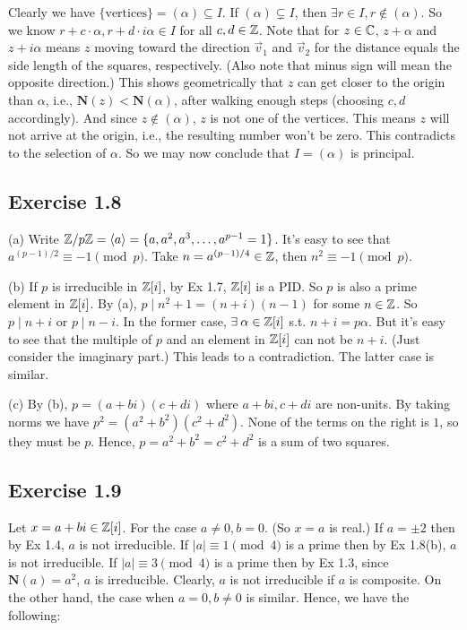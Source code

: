 \documentclass[../Marcus.tex]{subfiles}
\begin{document}
Clearly we have $\{\text{vertices}\}=(\alpha)\subseteq I$. If $(\alpha)\varsubsetneq I$, then $\exists r\in I,r\notin(\alpha)$. So we know $r+c\cdot\alpha,r+d\cdot i\alpha\in I$ for all $c,d\in\mathbb{Z}$. Note that for $z\in\mathbb{C}$, $z+\alpha$ and $z+i\alpha$ means $z$ moving toward the direction $\vec v_1$ and $\vec v_2$ for the distance equals the side length of the squares, respectively. (Also note that minus sign will mean the opposite direction.) This shows geometrically that $z$ can get closer to the origin than $\alpha$, i.e., $\mathbf{N}(z)<\mathbf{N}(\alpha)$, after walking enough steps (choosing $c,d$ accordingly). And since $z\notin(\alpha)$, $z$ is not one of the vertices. This means $z$ will not arrive at the origin, i.e., the resulting number won't be zero. This contradicts to the selection of $\alpha$. So we may now conclude that $I=(\alpha)$ is principal.
 
\subsection*{Exercise 1.8}

(a) Write $\mathbb{Z}/p\mathbb{Z}=\langle a \rangle=\{a,a^2,a^3,\ldots,a^{p-1}=1\}$. It's easy to see that $a^{(p-1)/2}\equiv -1 \pmod{p}$. Take $n=a^{(p-1)/4}\in\mathbb{Z}$, then $n^2\equiv -1\pmod{p}$.

(b) If $p$ is irreducible in $\mathbb{Z}[i]$, by Ex 1.7, $\mathbb{Z}[i]$ is a PID. So $p$ is also a prime element in $\mathbb{Z}[i]$. By (a), $p\mid n^2+1=(n+i)(n-1)$ for some $n\in\mathbb{Z}$. So $p\mid n+i$ or $p\mid n-i$. In the former case, $\exists \alpha\in\ZZ[i]$ s.t. $n+i=p\alpha$. But it's easy to see that the multiple of $p$ and an element in $\mathbb{Z}[i]$ can not be $n+i$. (Just consider the imaginary part.) This leads to a contradiction. The latter case is similar.

(c) By (b), $p=(a+bi)(c+di)$ where $a+bi,c+di$ are non-units. By taking norms we have $p^2=(a^2+b^2)(c^2+d^2)$. None of the terms on the right is $1$, so they must be $p$. Hence, $p=a^2+b^2=c^2+d^2$ is a sum of two squares.

\subsection*{Exercise 1.9}

Let $x=a+bi\in\mathbb{Z}[i]$. For the case $a\neq 0,b=0$. (So $x=a$ is real.) If $a=\pm2$ then by Ex 1.4, $a$ is not irreducible. If $|a|\equiv 1\pmod{4}$ is a prime then by Ex 1.8(b), $a$ is not irreducible. If $|a|\equiv 3\pmod{4}$ is a prime then by Ex 1.3, since $\mathbf{N}(a)=a^2$, $a$ is irreducible. Clearly, $a$ is not irreducible if $a$ is composite. On the other hand, the case when $a=0,b\neq 0$ is similar. Hence, we have the following:
\end{document}
